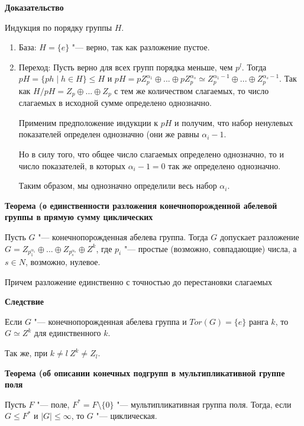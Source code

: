 \documentclass{article}
\begin{document}
\vspace{5pt}

\textbf{Доказательство}

Индукция по порядку группы $H$.
\begin{enumerate}
	\item База: $H = \{e\}$ "--- верно, так как разложение пустое.
	\item Переход: Пусть верно для всех групп порядка меньше, чем $p^l$. Тогда $pH = \{ph \mid h \in H\} \leq H$ и $pH = pZ_p^{\alpha_1} \oplus ... \oplus pZ_p^{\alpha_s} \simeq Z_p^{\alpha_1-1} \oplus ... \oplus Z_p^{\alpha_s-1}$. Так как $H / pH = Z_p \oplus ... \oplus Z_p$ с тем же количеством слагаемых, то число слагаемых в исходной сумме определено однозначно.
	
	Применим предположение индукции к $pH$ и получим, что набор ненулевых показателей определен однозначно (они же равны $\alpha_i-1$.
	
	Но в силу того, что общее число слагаемых определено однозначно, то и число показателей, в которых $\alpha_i - 1 = 0$ так же определено однозначно.
	
	Таким образом, мы однозначно определили весь набор $\alpha_i$.
\end{enumerate}

\vspace{10pt}

\textbf{Теорема (о единственности разложения конечнопорожденной абелевой группы в прямую сумму циклических}

Пусть $G$ "--- конечнопорожденная абелева группа. Тогда $G$ допускает разложение $G = Z_{p_1^{\alpha_1}} \oplus ... \oplus  Z_{p_s^{\alpha_s}} \oplus Z^k$, где $p_i$ "--- простые (возможно, совпадающие) числа, а $s \in N$, возможно, нулевое.

Причем разложение единственно с точностью до перестановки слагаемых

\vspace{10pt}

\textbf{Следствие}

Если $G$ "--- конечнопорожденная абелева группа и $Tor(G) = \{e\}$ ранга $k$, то $G \simeq Z^k$ для единственного $k$.

Так же, при $k \neq l \ Z^k \neq Z_l$.

\vspace{10pt}

\textbf{Теорема (об описании конечных подгрупп в мультипликативной группе поля}

Пусть $F$ "--- поле, $F^* = F \setminus \{0\}$ "--- мультипликативная группа поля. Тогда, если $G \leq F^*$ и $|G| \leq \infty$, то $G$ "--- циклическая.
\end{document}
